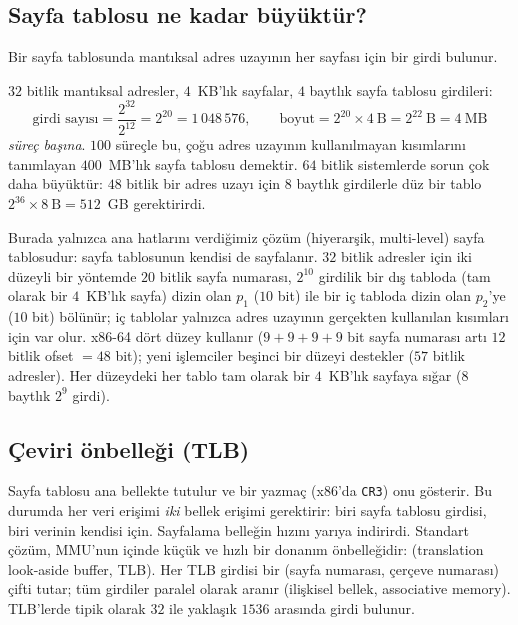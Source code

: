 \subsection{Sayfa tablosu ne kadar büyüktür?}

Bir sayfa tablosunda mantıksal adres uzayının her sayfası için bir girdi bulunur.

\begin{example}
$32$ bitlik mantıksal adresler, $4$~KB'lık sayfalar, $4$ baytlık sayfa tablosu girdileri:
\[
\text{girdi sayısı} = \frac{2^{32}}{2^{12}} = 2^{20} = 1\,048\,576,
\qquad
\text{boyut} = 2^{20} \times 4\ \text{B} = 2^{22}\ \text{B} = 4\ \text{MB}
\]
\emph{süreç başına}. $100$ süreçle bu, çoğu adres uzayının kullanılmayan kısımlarını tanımlayan $400$~MB'lık sayfa tablosu demektir. $64$ bitlik sistemlerde sorun çok daha büyüktür: $48$ bitlik bir adres uzayı için $8$ baytlık girdilerle düz bir tablo $2^{36} \times 8\ \text{B} = 512$~GB gerektirirdi.
\end{example}

Burada yalnızca ana hatlarını verdiğimiz çözüm  (hiyerarşik, multi-level) sayfa tablosudur: sayfa tablosunun kendisi de sayfalanır. $32$ bitlik adresler için iki düzeyli bir yöntemde $20$ bitlik sayfa numarası, $2^{10}$ girdilik bir dış tabloda (tam olarak bir $4$~KB'lık sayfa) dizin olan $p_1$ ($10$ bit) ile bir iç tabloda dizin olan $p_2$'ye ($10$ bit) bölünür; iç tablolar yalnızca adres uzayının gerçekten kullanılan kısımları için var olur. x86-64 dört düzey kullanır ($9+9+9+9$ bit sayfa numarası artı $12$ bitlik ofset $=48$ bit); yeni işlemciler beşinci bir düzeyi destekler ($57$ bitlik adresler). Her düzeydeki her tablo tam olarak bir $4$~KB'lık sayfaya sığar ($8$ baytlık $2^{9}$ girdi).

\subsection{Çeviri önbelleği (TLB)}

Sayfa tablosu ana bellekte tutulur ve bir yazmaç (x86'da \texttt{CR3}) onu gösterir. Bu durumda her veri erişimi \emph{iki} bellek erişimi gerektirir: biri sayfa tablosu girdisi, biri verinin kendisi için. Sayfalama belleğin hızını yarıya indirirdi. Standart çözüm, MMU'nun içinde küçük ve hızlı bir donanım önbelleğidir:  (translation look-aside buffer, TLB). Her TLB girdisi bir (sayfa numarası, çerçeve numarası) çifti tutar; tüm girdiler paralel olarak aranır (ilişkisel bellek, associative memory). TLB'lerde tipik olarak $32$ ile yaklaşık $1536$ arasında girdi bulunur.

